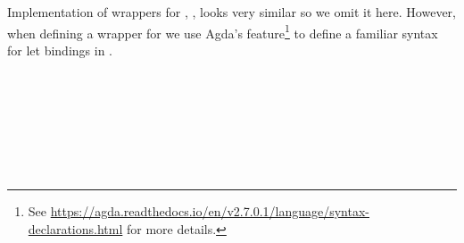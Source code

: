 Implementation of wrappers for , ,  looks very similar
so we omit it here.  However, when defining a wrapper for  we
use Agda's  feature\footnote{See
\url{https://agda.readthedocs.io/en/v2.7.0.1/language/syntax-declarations.html}
for more details.} to define a familiar syntax for let bindings in .
\begin{code}[hide]%
%
\>[2]%
\>[1664I]\AgdaSymbol{:}\AgdaSpace{}%
\AgdaSpace{}%
\AgdaSymbol{\{}\AgdaSymbol{\}}\<%
\\
\>[1664I][@{}l@{\AgdaIndent{0}}]%
\>[7]\AgdaSpace{}%
\AgdaSymbol{(}\AgdaSpace{}%
\AgdaSymbol{(}\AgdaSpace{}%
\AgdaSpace{}%
\AgdaSpace{}%
\AgdaSymbol{)}\AgdaSpace{}%
\AgdaSymbol{(}\AgdaSpace{}%
\AgdaSymbol{)}\AgdaSpace{}%
\AgdaSpace{}%
\AgdaSpace{}%
\AgdaSymbol{(}\AgdaSpace{}%
\AgdaSpace{}%
\AgdaSpace{}%
\AgdaSymbol{)}\AgdaSpace{}%
\AgdaSymbol{(}\AgdaSpace{}%
\AgdaSymbol{))}\<%
\\
%
\>[7]\AgdaSpace{}%
\AgdaSpace{}%
\AgdaSpace{}%
\AgdaSymbol{(}\AgdaSpace{}%
\AgdaSymbol{)}\<%
\\
%
\>[2]\AgdaSpace{}%
\AgdaSpace{}%
\AgdaSymbol{=}\AgdaSpace{}%
\AgdaSpace{}%
\AgdaSymbol{(}\AgdaSpace{}%
\AgdaSpace{}%
\AgdaSymbol{\{}\AgdaSymbol{\}}\AgdaSpace{}%
\AgdaSpace{}%
\AgdaSpace{}%
\AgdaSpace{}%
\AgdaSpace{}%
\AgdaSpace{}%
\AgdaSpace{}%
\AgdaSpace{}%
\AgdaSymbol{)}\<%
\\
%
\\[\AgdaEmptyExtraSkip]%
%
\>[2]%
\>[1700I]\AgdaSymbol{:}\AgdaSpace{}%
\AgdaSpace{}%
\AgdaSymbol{\{}\AgdaSymbol{\}}\<%
\\
\>[.][@{}l@{}]\<[1700I]%
\>[8]\AgdaSpace{}%
\AgdaSymbol{(}\AgdaSpace{}%
\AgdaSymbol{(}\AgdaSpace{}%

\end{code}
